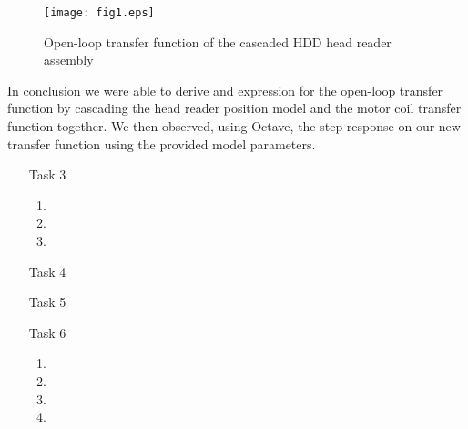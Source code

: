 \documentclass{article}
\begin{document}
	\begin{figure}[H]
		\caption{Open-loop transfer function of the cascaded HDD head reader
		assembly}
		\centering
		\texttt{[image: fig1.eps]}
	\end{figure}

	In conclusion we were able to derive and expression for the open-loop
	transfer function by cascading the head reader position model and the motor
	coil transfer function together. We then observed, using Octave, the step
	response on our new transfer function using the provided model parameters.

\begin{itemize}

\item[Task 3]

  \begin{enumerate}[A]
  \item
  \item
  \item
  \end{enumerate}

\item[Task 4]
\item[Task 5]
\item[Task 6]

  \begin{enumerate}[A]
  \item
  \item
  \item
  \item
  \end{enumerate}

\end{itemize}
\end{document}
